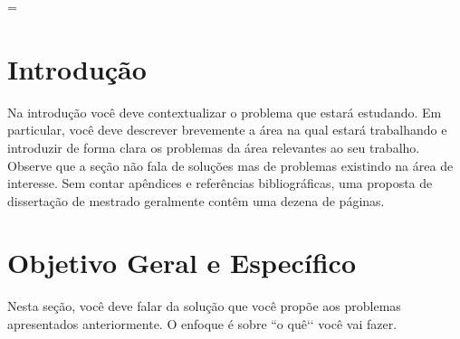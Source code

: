 \documentclass[a4paper,titlepage,12pt]{article}
\begin{document}


\pagestyle{plain}

\listoffigures
\newpage

\listoftables
\newpage
\incluilistadealgoritmos

\tableofcontents
\newpage


\pagestyle{plain}
\setcounter{page}{1}

\pagestyle{fancy}
\addtolength{\headwidth}{\marginparsep}\addtolength{\headwidth}{\marginparwidth}\headwidth
= \textwidth
\renewcommand{\sectionmark}[1]{\markright{\thesection\ #1}}\lhead[\fancyplain{}{\bfseries\thepage}]%
         {\fancyplain{}{\emph{\rightmark}}}\rhead[\fancyplain{}{\bfseries\leftmark}]%
             {\fancyplain{}{\bfseries\thepage}}\cfoot{}



\section{Introdução}
\label{sec:introdu}

Na introdução você deve contextualizar o problema que estará estudando. Em particular, você deve descrever brevemente a área na qual estará trabalhando e introduzir de forma clara os problemas da área relevantes ao seu trabalho. Observe que a seção não fala de soluções mas de problemas existindo na área de interesse.
Sem contar apêndices e referências bibliográficas, uma proposta de dissertação de mestrado geralmente contêm uma dezena de páginas.

\section{Objetivo Geral e Específico}
\label{sec:objetivo}

Nesta seção, você deve falar da solução que você propõe aos problemas apresentados anteriormente. O enfoque é sobre ``o quê‘‘ você vai fazer.
\end{document}
